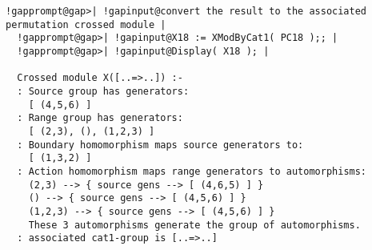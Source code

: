 \documentclass[a4paper,11pt]{report}
\begin{document}
{{\begin{Verbatim}[commandchars=!@|,fontsize=\small,frame=single,label=Example]
  !gapprompt@gap>| !gapinput@convert the result to the associated permutation crossed module |
  !gapprompt@gap>| !gapinput@X18 := XModByCat1( PC18 );; |
  !gapprompt@gap>| !gapinput@Display( X18 ); |
  
  Crossed module X([..=>..]) :- 
  : Source group has generators:
    [ (4,5,6) ]
  : Range group has generators:
    [ (2,3), (), (1,2,3) ]
  : Boundary homomorphism maps source generators to:
    [ (1,3,2) ]
  : Action homomorphism maps range generators to automorphisms:
    (2,3) --> { source gens --> [ (4,6,5) ] }
    () --> { source gens --> [ (4,5,6) ] }
    (1,2,3) --> { source gens --> [ (4,5,6) ] }
    These 3 automorphisms generate the group of automorphisms.
  : associated cat1-group is [..=>..]
  
  
\end{Verbatim}
 }

 }

            
\end{document}
